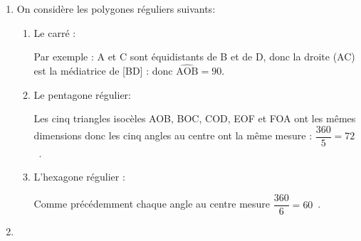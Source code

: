 
\medskip

\begin{enumerate}
\item On considère les polygones réguliers suivants:
	\begin{enumerate}
		\item Le carré :
		
Par exemple : A et C sont équidistants de B et de D, donc la droite (AC) est la médiatrice de [BD] : donc $\widehat{\text{AOB}}= 90$\degres.
		\item Le pentagone régulier:

%
%
Les cinq triangles isocèles AOB, BOC, COD, EOF et FOA ont les mêmes dimensions donc les cinq angles au centre ont la même mesure : $\dfrac{360}{5} = 72$~\degres.
		\item L'hexagone régulier :

%
Comme précédemment chaque angle au centre mesure $\dfrac{360}{6} = 60$~\degres.
	\end{enumerate}
\item ~
	

\end{enumerate}
